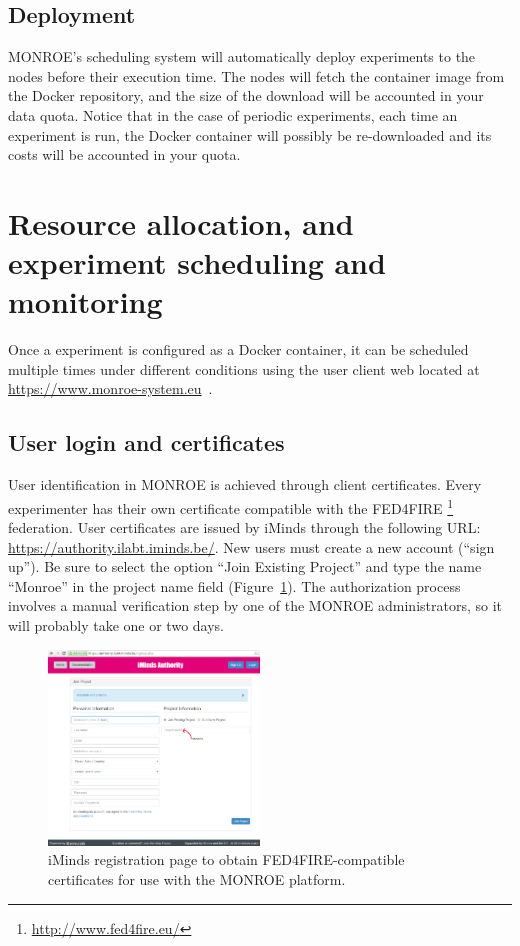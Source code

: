 \documentclass[a4paper,10pt]{article}
\newcommand{\monroe}{MONROE}
\begin{document}
\subsection{Deployment}
\label{subsec:deployment}
\monroe{}'s scheduling system will automatically deploy experiments to the nodes before their execution time.
The nodes will fetch the container image from the Docker repository, and the size of the download will be accounted in your data quota.
Notice that in the case of periodic experiments, each time an experiment is run, the Docker container will possibly be re-downloaded and its costs will be accounted in your quota.


\section{Resource allocation, and experiment scheduling and monitoring}
\label{sec:allocSchedMonitor}

Once a experiment is configured as a Docker container, it can be scheduled multiple times under different conditions using the user client web located at \url{https://www.monroe-system.eu}~.

\subsection{User login and certificates}
\label{subsec:login}
User identification in \monroe{} is achieved through client certificates.
Every experimenter has their own certificate compatible with the FED4FIRE%
\footnote{\url{http://www.fed4fire.eu/}} %
federation.
User certificates are issued by iMinds through the following URL: \url{https://authority.ilabt.iminds.be/}.
New users must create a new account (``sign up'').
Be sure to select the option ``Join Existing Project'' and type the name ``Monroe'' in the project name field (Figure~\ref{fig:iMindsCreateAccount}).
The authorization process involves a manual verification step by one of the \monroe{} administrators, so it will probably take one or two days.

\begin{figure}[tp]
	\centering
	\includegraphics[width=0.5\textwidth]{iMindsCreateAccount2.png}
	\caption{iMinds registration page to obtain FED4FIRE-compatible certificates for use with the \monroe{} platform.}
	\label{fig:iMindsCreateAccount}
\end{figure}
\end{document}
